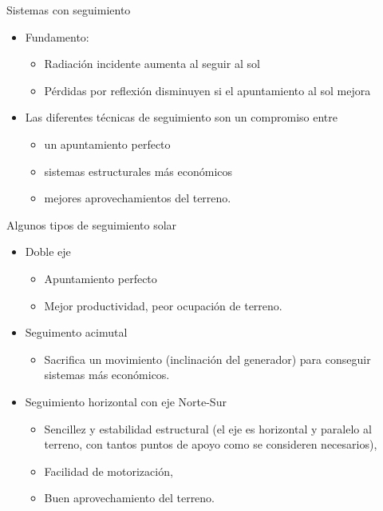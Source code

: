 \documentclass[xcolor={usenames,svgnames,dvipsnames}]{beamer}
\begin{document}
\begin{frame}[label={sec:orgf9719de}]{Sistemas con seguimiento}
\begin{itemize}[<+->]
\item \alert{Fundamento:}
\begin{itemize}[<.->]
\item Radiación incidente aumenta al seguir al sol

\item Pérdidas por reflexión disminuyen si el apuntamiento al sol mejora
\end{itemize}

\item Las diferentes técnicas de seguimiento son un \alert{compromiso} entre
\begin{itemize}[<.->]
\item un \alert{apuntamiento perfecto}

\item \alert{sistemas estructurales más económicos}

\item mejores \alert{aprovechamientos del terreno}.
\end{itemize}
\end{itemize}
\end{frame}
\begin{frame}[label={sec:org5af1ce4}]{Algunos tipos de seguimiento solar}
\begin{itemize}[<+->]
\item \alert{Doble eje}
\begin{itemize}[<.->]
\item Apuntamiento \guillemotleft{}perfecto\guillemotright{}

\item Mejor productividad, peor ocupación de terreno.
\end{itemize}

\item \alert{Seguimento acimutal}
\begin{itemize}[<.->]
\item Sacrifica un movimiento (inclinación del generador) para conseguir
sistemas más económicos.
\end{itemize}

\item \alert{Seguimiento horizontal con eje Norte-Sur}
\begin{itemize}[<.->]
\item Sencillez y estabilidad estructural (el eje es horizontal y
paralelo al terreno, con tantos puntos de apoyo como se consideren
necesarios),

\item Facilidad de motorización,

\item Buen aprovechamiento del terreno.
\end{itemize}
\end{itemize}
\end{frame}
\end{document}
